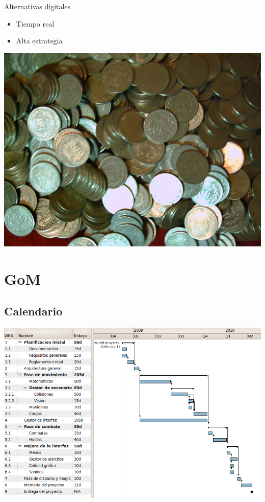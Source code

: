 \documentclass[green, compress]{beamer}
\begin{document}
\begin{frame}{Alternativas digitales}
  \begin{minipage}[h]{.35\columnwidth}
    \begin{itemize}
    \item Tiempo real
    \item Alta estrategia
    \end{itemize}
  \end{minipage}
  \begin{minipage}[h]{.6\columnwidth}
    \centering
    \includegraphics[scale=.07]{imagenes/Dinero_colombia.jpg}
  \end{minipage}
\end{frame}

\section{GoM}
\subsection{Calendario}
\begin{frame}
  \centering
  \includegraphics[scale=.35]{imagenes/gGantt.png}
\end{frame}
\end{document}
